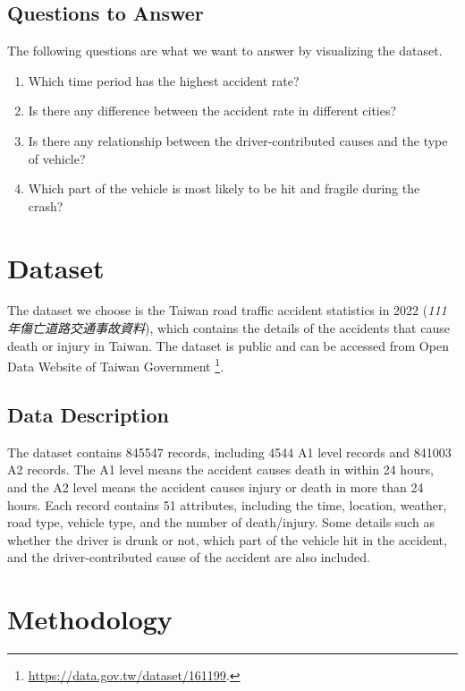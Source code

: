 \documentclass[a4paper, oneside, final, 12pt]{scrartcl} %
\begin{document}
  \subsection{Questions to Answer}
  
  The following questions are what we want to answer by visualizing the dataset.
  
  \begin{enumerate}
    \item Which time period has the highest accident rate?
    \item Is there any difference between the accident rate in different cities?
    \item Is there any relationship between the 
    driver-contributed causes and the type of vehicle?
    \item Which part of the vehicle is most likely to be hit and fragile during the crash?
  \end{enumerate}

\section{Dataset}

\begingroup
\raggedright

The dataset we choose is the Taiwan road traffic accident statistics 
in 2022 (\emph{111年傷亡道路交通事故資料}), which contains the details of
the accidents that cause death or injury in Taiwan.
The dataset is public and can be accessed from Open Data Website of Taiwan Government
\footnote{\url{https://data.gov.tw/dataset/161199}.}.

\subsection{Data Description}

The dataset contains 845547 records, 
including 4544 A1 level records and 841003 A2 records.
The A1 level means the accident causes death in within 24 hours,
and the A2 level means the accident causes injury or death in more than 24 hours.
Each record contains 51 attributes, including the time, location,
weather, road type, vehicle type, and the number of death/injury.
Some details such as whether the driver is drunk or not, 
which part of the vehicle hit in the accident, 
and the driver-contributed cause of the accident are also included.

\section{Methodology}
\end{document}
